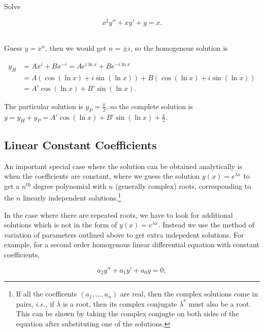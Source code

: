 \documentclass[english,a4paper,12pt]{report}
\begin{document}
{Solve

\begin{equation}
    x^2 y'' +xy' + y = x.
\end{equation}~
}
{Guess \(y = x^{n} \), then we would get \(n= \pm i\), so the homogenous solution is 

\begin{equation}
    \begin{aligned} 
    y_{H} &= Ax^{i}+Bx^{-i} = Ae^{i \ln x}+Be^{-i \ln x} \\ &= A(\cos (\ln x)+i \sin (\ln x))+B(\cos (\ln x)+i\sin (\ln x)) \\ &= A'\cos (\ln x)+B'\sin (\ln x).
    \end{aligned}      
\end{equation}

The particular solution is \(y_{P}= \frac{x}{2} \), so the complete solution is \(y = y_{H}+y_{P} = A'\cos (\ln x)+B'\sin (\ln x)+\frac{x}{2}    \).  




}

\subsection{Linear Constant Coefficients}

An important special case where the solution can be obtained analytically is when the coefficients are constant, where we guess the solution \(y(x) = e^{\lambda x} \) to get a \(n^{\text{th}} \) degree polynomial with \(n\) (generally complex) roots, corresponding to the \(n\) linearly independent solutions.\footnote{If all the coefficents \((a_1 ,\ldots ,a_{n} )\) are real, then the complex solutions come in pairs, \textit{i.e.,} if \(\lambda \) is a root, then its complex conjugate \(\lambda ^*\) must also be a root. This can be shown by taking the complex conjugte on both sides of the equation after substituting one of the solutions.}

In the case where there are repeated roots, we have to look for additional solutions which is not in the form of \(y(x) = e^{\lambda x} \). Instead we use the method of variation of parameters outlined above to get extra indepedent solutions. For example, for a second order homogenous linear differential equation with constant coefficients, 

\begin{equation}
    a_2 y'' + a_1 y' + a_0 y = 0, \label{secondlinear} 
\end{equation}
\end{document}
